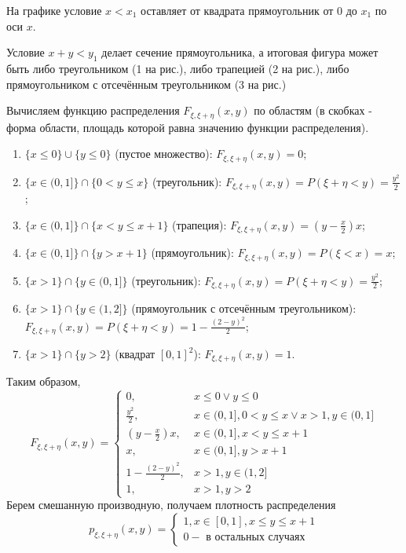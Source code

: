 \begin{exmp}
\begin{enumerate}
		На графике условие $x < x_1$ оставляет от квадрата прямоугольник от 0 до $x_1$ по оси $x$.
		
		Условие $x + y < y_1$ делает сечение прямоугольника, а итоговая фигура может быть либо треугольником (1 на рис.), либо трапецией (2 на рис.), либо прямоугольником с отсечённым треугольником (3 на рис.)
		
		Вычисляем функцию распределения $F_{\xi, \xi + \eta} (x, y)$ по областям (в скобках - форма области, площадь которой равна значению функции распределения).
		\begin{enumerate}
			\item $\{ x \le 0 \} \cup \{ y \le 0 \}$ (пустое множество): $F_{\xi, \xi + \eta} (x, y) = 0$;
			\item $\{ x \in (0, 1] \} \cap \{ 0 < y \le x \}$ (треугольник): $F_{\xi, \xi + \eta} (x, y) = P(\xi + \eta < y) = \frac{y^2}{2}$;
			\item $\{ x \in (0, 1] \} \cap \{ x < y \le x + 1 \}$ (трапеция): $F_{\xi, \xi + \eta} (x, y) = \left(y-\frac{x}{2}\right)x$;
			\item $\{ x \in (0, 1] \} \cap \{ y > x + 1 \}$ (прямоугольник): $F_{\xi, \xi + \eta} (x, y) = P(\xi < x) = x$;
			\item $\{ x > 1 \} \cap \{ y \in (0, 1] \}$ (треугольник): $F_{\xi, \xi + \eta} (x, y) = P(\xi + \eta < y) = \frac{y^2}{2}$;
			\item $\{ x > 1 \} \cap \{ y \in (1, 2] \}$ (прямоугольник с отсечённым треугольником): $F_{\xi, \xi + \eta} (x, y) = P(\xi + \eta < y) = 1 - \frac{(2-y)^2}{2}$;
			\item $\{ x > 1 \} \cap \{ y > 2 \}$ (квадрат $[0, 1]^2$): $F_{\xi, \xi + \eta} (x, y) = 1$.
		\end{enumerate}
		Таким образом,
		\[
		F_{\xi, \xi + \eta} (x, y) =
		\begin{cases}
			0, &x \le 0 \lor y \le 0 \\
			\frac{y^2}{2}, &x \in (0, 1], 0 < y \le x \lor x > 1, y \in (0, 1] \\
			\left( y - \frac{x}{2} \right) x, &x \in (0, 1], x < y \le x + 1 \\
			x, &x \in (0, 1], y > x + 1 \\
			1 - \frac{(2-y)^2}{2}, &x > 1, y \in (1, 2] \\
			1, &x > 1, y > 2
		\end{cases}
		\]
		Берем смешанную производную, получаем плотность распределения
		\[
		p_{\xi, \xi + \eta} (x, y) =
		\begin{cases}
			1, x \in [0, 1], x \le y \le x + 1 \\
			0 - \text{ в остальных случаях}
		\end{cases}
		\]
		
	\end{enumerate}
\end{exmp}

